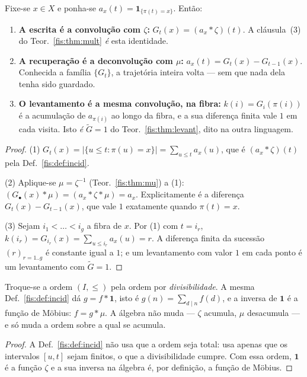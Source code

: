 \documentclass[livro.tex]{subfiles}
\begin{document}
\begin{teorema}\label{fis:thm:zetamu}
Fixe-se $x\in X$ e ponha-se $a_x(t)=\mathbf{1}_{\{\pi(t)=x\}}$. Então:
\begin{enumerate}\itemsep3pt
\item[(1)] \textbf{A escrita é a convolução com $\zeta$:} $G_t(x)=(a_x*\zeta)(t)$.
A cláusula~(3) do Teor.~\ref{fis:thm:mult} \emph{é} esta identidade.
\item[(2)] \textbf{A recuperação é a deconvolução com $\mu$:}
$a_x(t)=G_t(x)-G_{t-1}(x)$. Conhecida a família $\{G_t\}$, a trajetória inteira
volta --- sem que nada dela tenha sido guardado.
\item[(3)] \textbf{O levantamento é a mesma convolução, na fibra:}
$k(i)=G_i(\pi(i))$ é a acumulação de $a_{\pi(i)}$ ao longo da fibra, e a sua
diferença finita vale $1$ em cada visita. Isto \emph{é} $\tilde G=1$ do
Teor.~\ref{fis:thm:levant}, dito na outra linguagem.
\end{enumerate}
\end{teorema}

\begin{proof}
(1) $G_t(x)=\lvert\{u\le t:\pi(u)=x\}\rvert=\sum_{u\le t}a_x(u)$, que é
$(a_x*\zeta)(t)$ pela Def.~\ref{fis:def:incid}.

(2) Aplique-se $\mu=\zeta^{-1}$ (Teor.~\ref{fis:thm:mu}) a (1):
$(G_\bullet(x)*\mu)=(a_x*\zeta*\mu)=a_x$. Explicitamente é a diferença
$G_t(x)-G_{t-1}(x)$, que vale $1$ exatamente quando $\pi(t)=x$.

(3) Sejam $i_1<\dots<i_g$ a fibra de $x$. Por (1) com $t=i_r$,
$k(i_r)=G_{i_r}(x)=\sum_{u\le i_r}a_x(u)=r$. A diferença finita da sucessão
$(r)_{r=1..g}$ é constante igual a $1$; e um levantamento com valor $1$ em cada
ponto é um levantamento com $\tilde G=1$.
\end{proof}

\begin{corolario}\label{fis:cor:mobius}
Troque-se a ordem $(I,\le)$ pela ordem por \emph{divisibilidade}. A mesma
Def.~\ref{fis:def:incid} dá $g=f*\mathbf{1}$, isto é $g(n)=\sum_{d\mid n}f(d)$, e
a inversa de $\mathbf{1}$ é a função de Möbius: $f=g*\mu$. A álgebra não muda ---
$\zeta$ acumula, $\mu$ desacumula --- e só muda a ordem sobre a qual se acumula.
\end{corolario}

\begin{proof}
A Def.~\ref{fis:def:incid} não usa que a ordem seja total: usa apenas que os
intervalos $[u,t]$ sejam finitos, o que a divisibilidade cumpre. Com essa ordem,
$\mathbf{1}$ é a função $\zeta$ e a sua inversa na álgebra é, por definição, a
função de Möbius.
\end{proof}
\end{document}
